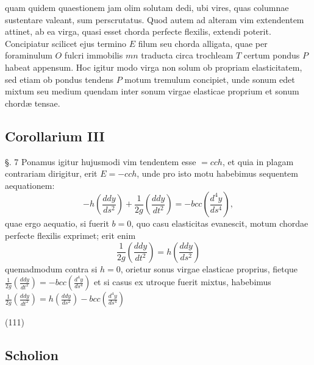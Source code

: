 \documentclass[11pt,a4paper]{article}
\begin{document}
quam quidem quaestionem jam olim solutam dedi, ubi vires, quas columnae
sustentare valeant, sum perscrutatus. Quod autem ad alteram vim
extendentem attinet, ab ea virga, quasi esset chorda perfecte flexilis,
extendi poterit. Concipiatur scilicet ejus termino $E$ filum seu chorda
alligata, quae per foraminulum $O$ fulcri immobilis $mn$ traducta circa
trochleam $T$ certum pondus $P$ habeat appensum. Hoc igitur modo virga non
solum ob propriam elasticitatem, sed etiam ob pondus tendens $P$ motum
tremulum concipiet, unde sonum edet mixtum seu medium quendam inter sonum
virgae elasticae proprium et sonum chordæ tensae.

\subsection{Corollarium III}

§. 7 Ponamus igitur hujusmodi vim tendentem esse $= cch$, et quia in plagam
contrariam dirigitur, erit $E = -cch$, unde pro isto motu habebimus
sequentem aequationem:
\[
-h\left(\frac{ddy}{ds^2}\right) + \frac{1}{2g}\left(\frac{ddy}{dt^2}\right)
= -bcc\left(\frac{d^4y}{ds^4}\right),
\]
quae ergo aequatio, si fuerit $b = 0$, quo casu elasticitas evanescit,
motum chordae perfecte flexilis exprimet; erit enim
\[
\frac{1}{2g}\left(\frac{ddy}{dt^2}\right) = h\left(\frac{ddy}{ds^2}\right)
\]
quemadmodum contra si $h = 0$, orietur sonus virgae elasticae proprius,
fietque
$\frac{1}{2g}\left(\frac{ddy}{dt^2}\right) = -bcc\left(\frac{d^4y}{ds^4}\right)$
et si casus ex utroque fuerit mixtus, habebimus
$\frac{1}{2g}\left(\frac{ddy}{dt^2}\right) = h\left(\frac{ddy}{ds^2}\right) - bcc\left(\frac{d^4y}{ds^4}\right)$

(111)

\subsection{Scholion}
\end{document}
